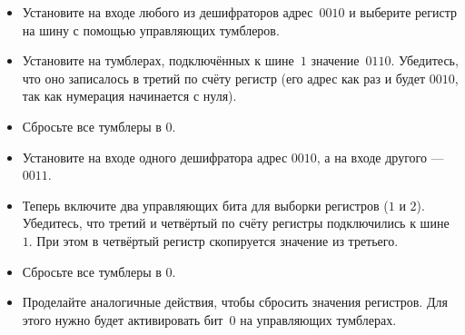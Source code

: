 \begin{itemize}
    \item Установите на входе любого из дешифраторов адрес~$0010$ и выберите регистр на шину с помощью управляющих тумблеров.
    \item Установите на тумблерах, подключённых к шине~$1$ значение~$0110$. Убедитесь, что оно записалось в третий по счёту регистр
          (его адрес как раз и будет $0010$, так как нумерация начинается с нуля).
    \item Сбросьте все тумблеры в $0$.
    \item Установите на входе одного дешифратора адрес $0010$, а на входе другого --- $0011$.
    \item Теперь включите два управляющих бита для выборки регистров ($1$ и $2$). Убедитесь, что третий и четвёртый по счёту
          регистры подключились к шине~$1$. При этом в четвёртый регистр скопируется значение из третьего.
    \item Сбросьте все тумблеры в $0$.
    \item Проделайте аналогичные действия, чтобы сбросить значения регистров. Для этого нужно будет активировать
          бит~$0$ на управляющих тумблерах.
\end{itemize}
